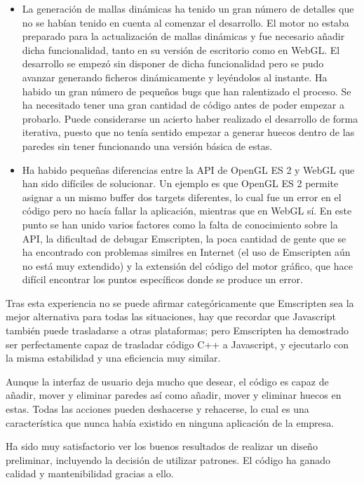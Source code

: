 \begin{itemize}
    \item La generación de mallas dinámicas ha tenido un gran número de detalles que no se habían tenido en cuenta al comenzar el desarrollo. El motor no estaba preparado para la actualización de mallas dinámicas y fue necesario añadir dicha funcionalidad, tanto en su versión de escritorio como en WebGL. El desarrollo se empezó sin disponer de dicha funcionalidad pero se pudo avanzar generando ficheros dinámicamente y leyéndolos al instante. Ha habido un gran número de pequeños bugs que han ralentizado el proceso. Se ha necesitado tener una gran cantidad de código antes de poder empezar a probarlo. Puede considerarse un acierto haber realizado el desarrollo de forma iterativa, puesto que no tenía sentido empezar a generar huecos dentro de las paredes sin tener funcionando una versión básica de estas.
    
    \item Ha habido pequeñas diferencias entre la API de OpenGL ES 2 y WebGL que han sido difíciles de solucionar. Un ejemplo es que OpenGL ES 2 permite asignar a un mismo buffer dos targets diferentes, lo cual fue un error en el código pero no hacía fallar la aplicación, mientras que en WebGL sí. En este punto se han unido varios factores como la falta de conocimiento sobre la API, la dificultad de debugar Emscripten, la poca cantidad de gente que se ha encontrado con problemas similres en Internet (el uso de Emscripten aún no está muy extendido) y la extensión del código del motor gráfico, que hace difícil encontrar los puntos específicos donde se produce un error.
\end{itemize}

Tras esta experiencia no se puede afirmar categóricamente que Emscripten sea la mejor alternativa para todas las situaciones, hay que recordar que Javascript también puede trasladarse a otras plataformas; pero Emscripten ha demostrado ser perfectamente capaz de trasladar código C++ a Javascript, y ejecutarlo con la misma estabilidad y una eficiencia muy similar.

Aunque la interfaz de usuario deja mucho que desear, el código es capaz de añadir, mover y eliminar paredes así como añadir, mover y eliminar huecos en estas. Todas las acciones pueden deshacerse y rehacerse, lo cual es una característica que nunca había existido en ninguna aplicación de la empresa.

Ha sido muy satisfactorio ver los buenos resultados de realizar un diseño preliminar, incluyendo la decisión de utilizar patrones. El código ha ganado calidad y mantenibilidad gracias a ello.

